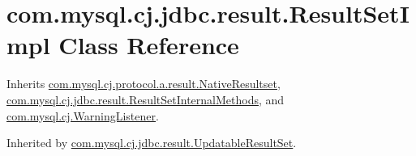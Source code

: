 \hypertarget{classcom_1_1mysql_1_1cj_1_1jdbc_1_1result_1_1_result_set_impl}{}\section{com.\+mysql.\+cj.\+jdbc.\+result.\+Result\+Set\+Impl Class Reference}
\label{classcom_1_1mysql_1_1cj_1_1jdbc_1_1result_1_1_result_set_impl}


Inherits \mbox{\hyperlink{classcom_1_1mysql_1_1cj_1_1protocol_1_1a_1_1result_1_1_native_resultset}{com.\+mysql.\+cj.\+protocol.\+a.\+result.\+Native\+Resultset}}, \mbox{\hyperlink{interfacecom_1_1mysql_1_1cj_1_1jdbc_1_1result_1_1_result_set_internal_methods}{com.\+mysql.\+cj.\+jdbc.\+result.\+Result\+Set\+Internal\+Methods}}, and \mbox{\hyperlink{interfacecom_1_1mysql_1_1cj_1_1_warning_listener}{com.\+mysql.\+cj.\+Warning\+Listener}}.



Inherited by \mbox{\hyperlink{classcom_1_1mysql_1_1cj_1_1jdbc_1_1result_1_1_updatable_result_set}{com.\+mysql.\+cj.\+jdbc.\+result.\+Updatable\+Result\+Set}}.

